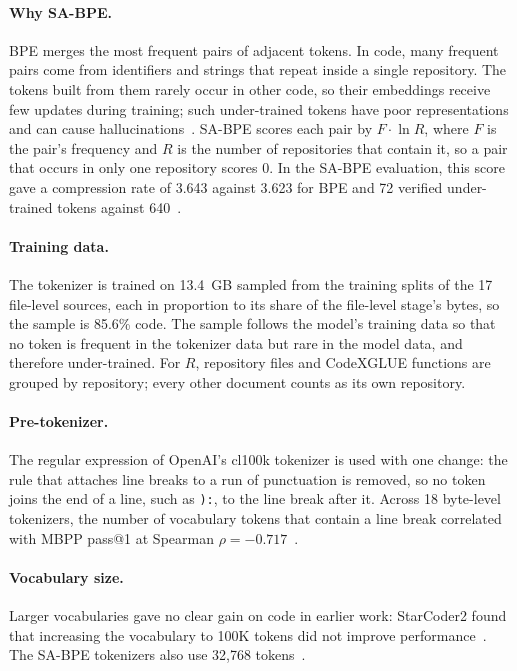 \documentclass[sigconf,nonacm,balance=false]{acmart}
\begin{document}
\paragraph{Why SA-BPE\@.} BPE merges the most frequent pairs of adjacent tokens. In code, many frequent pairs come
from identifiers and strings that repeat inside a single repository. The tokens built from them rarely occur in other
code, so their embeddings receive few updates during training; such under-trained tokens have poor representations
and can cause hallucinations~\cite{chizhov2026sabpe}. SA-BPE scores each pair by $F \cdot \ln R$,
where $F$ is the pair's frequency and $R$ is the number of repositories that contain it, so a pair that occurs in only
one repository scores 0. In the SA-BPE evaluation, this score gave a compression rate of 3.643 against 3.623 for BPE
and 72 verified under-trained tokens against 640~\cite{chizhov2026sabpe}.

\paragraph{Training data.} The tokenizer is trained on 13.4~GB sampled from the training splits of the 17 file-level
sources, each in proportion to its share of the file-level stage's bytes, so the sample is 85.6\% code. The sample
follows the model's training data so that no token is frequent in the tokenizer data but rare in the model data, and
therefore under-trained. For $R$, repository files and CodeXGLUE
functions are grouped by repository; every other document counts as its own repository.

\paragraph{Pre-tokenizer.} The regular expression of OpenAI's cl100k tokenizer is used with one change: the rule that
attaches line breaks to a run of punctuation is removed, so no token joins the end of a line, such as \texttt{):}, to
the line break after it. Across 18 byte-level tokenizers, the number of vocabulary tokens that contain a line break
correlated with MBPP pass@1 at Spearman $\rho = -0.717$~\cite{meister2026tokeval}.

\paragraph{Vocabulary size.} Larger vocabularies gave no clear gain on code in earlier work: StarCoder2 found that
increasing the vocabulary to 100K tokens did not improve performance~\cite{lozhkov2024starcoder2}. The SA-BPE
tokenizers also use 32,768 tokens~\cite{chizhov2026sabpe}.
\end{document}
